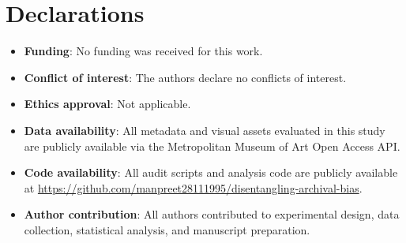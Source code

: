 \documentclass[pdflatex,sn-mathphys-num]{sn-jnl}%
\theoremstyle{thmstyleone}%
\theoremstyle{thmstyletwo}%
\theoremstyle{thmstylethree}%
\begin{document}
\section*{Declarations}

\begin{itemize}
\item \textbf{Funding}: No funding was received for this work.
\item \textbf{Conflict of interest}: The authors declare no conflicts of interest.
\item \textbf{Ethics approval}: Not applicable.
\item \textbf{Data availability}: All metadata and visual assets evaluated in this study are publicly available via the Metropolitan Museum of Art Open Access API.
\item \textbf{Code availability}: All audit scripts and analysis code are publicly available at \url{https://github.com/manpreet28111995/disentangling-archival-bias}.
\item \textbf{Author contribution}: All authors contributed to experimental design, data collection, statistical analysis, and manuscript preparation.
\end{itemize}



\end{document}
